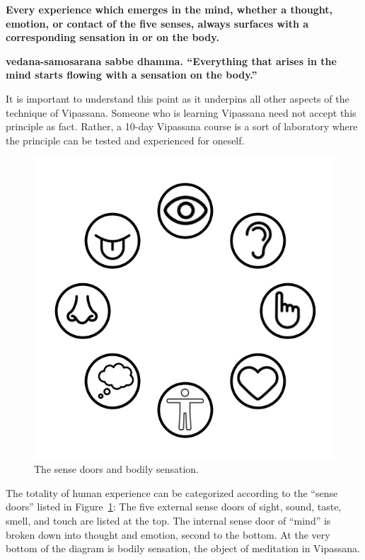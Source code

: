 \documentclass[a4paper, amsfonts, amssymb, amsmath, reprint, showkeys, nofootinbib, twoside]{revtex4-1}
\begin{document}
\vspace{1cm}
\textbf{Every experience which emerges in the mind, whether a thought, emotion, or
  contact of the five senses, always surfaces with a corresponding sensation in or on the body.}
\vspace{1cm}

\cite{hauke2018}

\textbf{vedana-samosarana sabbe dhamma. ``Everything
that arises in the mind starts flowing with a sensation
on the body.''} \cite{goenka1999discourses}

It is important to understand this point as it underpins all other aspects of the
technique of Vipassana. Someone who is learning Vipassana need not accept this
principle as fact. Rather, a 10-day Vipassana course is a sort of laboratory where the
principle can be tested and experienced for oneself.

\begin{figure}[H]
  \centering
  \includegraphics[width=0.8\linewidth]{images/sense-doors.png}
  \caption{The sense doors and bodily sensation. \cite{sense-icons}}
  \label{fig:sense-doors}
\end{figure}

The totality of human experience can be categorized according to the ``sense doors''
listed in Figure~\ref{fig:sense-doors}: The five external sense doors of sight, sound,
taste, smell, and touch are listed at the top. The internal sense door of ``mind'' is
broken down into thought and emotion, second to the bottom. At the very bottom of the
diagram is bodily sensation, the object of meditation in Vipassana.
\end{document}
